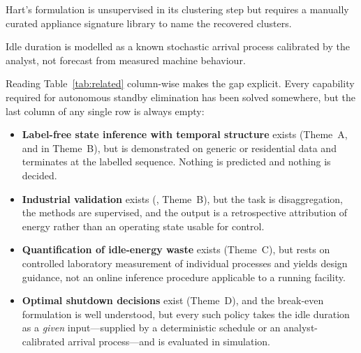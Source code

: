 \begin{table}[!t]
\begin{threeparttable}
\begin{tabular}{@{}lllccccc@{}}
\bottomrule
\end{tabular}
\begin{tablenotes}[flushleft]\footnotesize
\item[a] Hart's formulation is unsupervised in its clustering step but
requires a manually curated appliance signature library to name the
recovered clusters.
\item[b] Idle duration is modelled as a known stochastic arrival
process calibrated by the analyst, not forecast from measured machine
behaviour.
\end{tablenotes}
\end{threeparttable}
\end{table}

Reading Table~\ref{tab:related} column-wise makes the gap explicit.
Every capability required for autonomous standby elimination has been
solved somewhere, but the last column of any single row is always
empty:

\begin{itemize}
  \item \textbf{Label-free state inference with temporal structure}
  exists (Theme~A, and \cite{kolter2012afamap} in Theme~B), but is
  demonstrated on generic or residential data and terminates at the
  labelled sequence. Nothing is predicted and nothing is decided.

  \item \textbf{Industrial validation} exists
  (\cite{holmegaard2016industrial,martins2018imdeld}, Theme~B), but the
  task is disaggregation, the methods are supervised, and the output is
  a retrospective attribution of energy rather than an operating state
  usable for control.

  \item \textbf{Quantification of idle-energy waste} exists (Theme~C),
  but rests on controlled laboratory measurement of individual
  processes and yields design guidance, not an online inference
  procedure applicable to a running facility.

  \item \textbf{Optimal shutdown decisions} exist (Theme~D), and the
  break-even formulation is well understood, but every such policy
  takes the idle duration as a \emph{given} input---supplied by a
  deterministic schedule or an analyst-calibrated arrival
  process---and is evaluated in simulation.
\end{itemize}

\medskip
\noindent{}
\medskip


